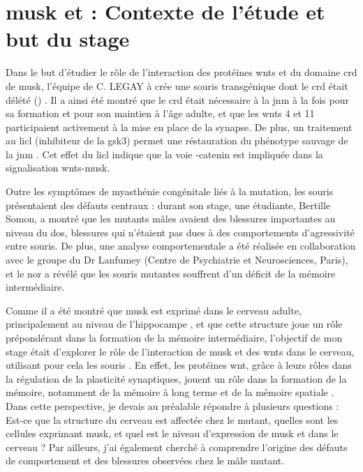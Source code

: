 \section{\acrshort{musk} et  : Contexte de l'étude et but du stage}
\label{sec:Contexte}	
	Dans le but d'étudier le rôle de l'interaction des protéines \Glspl{wnt} et du domaine \gls{crd} de \gls{musk}, l'équipe de C. LEGAY à crée une souris transgénique dont le \gls{crd} était délété (\mcrd) \cite{Messeant2015, Messeant2017}. Il a ainsi été montré que le \gls{crd} était nécessaire à la \gls{jnm} à la fois pour sa formation et pour son maintien à l'âge adulte, et que les \Glspl{wnt} 4 et 11 participaient activement à la mise en place de la synapse. De plus, un traitement au \gls{licl} (inhibiteur de la \gls{gsk3}) permet une réstauration du phénotype sauvage de la \gls{jnm} \cite{Messeant2015}. Cet effet du \gls{licl} indique que la voie \textbeta{}-catenin est impliquée dans la signalisation \Glspl{wnt}-\gls{musk}. 
	
	Outre les symptômes de myasthénie congénitale liés à la mutation, les souris \mcrd présentaient des défauts centraux : durant son stage, une étudiante, Bertille Somon, a montré que les mutants mâles avaient des blessures importantes au niveau du dos, blessures qui n'étaient pas dues à des comportements d'agressivité entre souris. De plus, une analyse comportementale a été réalisée en collaboration avec le groupe du Dr Lanfumey (Centre de Psychiatrie et Neurosciences, Paris), et le \gls{nor} a révélé que les souris mutantes souffrent d'un déficit de la mémoire intermédiaire.
	
	Comme il a été montré que \gls{musk} est exprimé dans le cerveau adulte, principalement au niveau de l'hippocampe \cite{Garcia-Osta2006}, et que cette structure joue un rôle prépondérant dans la formation de la mémoire intermédiaire, l'objectif de mon stage était d'explorer le rôle de l'interaction de \gls{musk} et des \Glspl{wnt} dans le cerveau, utilisant pour cela les souris \mcrd. En effet, les protéines \gls{wnt}, grâce à leurs rôles dans la régulation de la plasticité synaptiques, jouent un rôle dans la formation de la mémoire, notamment de la mémoire à long terme et de la mémoire spatiale \cite{Tan2013, Oliva2013a}. Dans cette perspective, je devais au préalable répondre à plusieurs questions : Est-ce que la structure du cerveau est affectée chez le mutant, quelles sont les cellules exprimant \gls{musk}, et quel est le niveau d'expression de \gls{musk} et \mcrd dans le cerveau ? Par ailleurs, j'ai également cherché à comprendre l'origine des défauts de comportement et des blessures observées chez le mâle mutant.